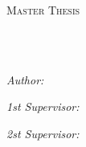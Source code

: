 \documentclass[
12pt, %
oneside, %
english, %
onehalfspacing, %
nolistspacing, %
parskip, %
headsepline, %
]{MastersDoctoralThesis} %
\author{Galina \textsc{Ryazanskaya}} %
\begin{document}
\frontmatter %

\pagestyle{plain} %


\begin{titlepage}


\begin{center}
\vspace*{.06\textheight}
{\scshape\LARGE \univname\par}\vspace{1.5cm} %
\textsc{\Large Master Thesis}\\[0.5cm] %

\HRule \\[0.4cm] %
{\huge \bfseries \ttitle\par}\vspace{0.4cm} %
\HRule \\[1.5cm] %
 
\begin{minipage}[t]{0.4\textwidth}
	\begin{flushleft} \large
	\emph{Author:}\\
	{\authorname} %
	\end{flushleft}
\end{minipage}
\begin{minipage}[t]{0.4\textwidth}
	\begin{flushright} \large
		\emph{1st Supervisor:} \\
		{\supname} %
	\end{flushright}
	\begin{flushright} \large
		\emph{2st Supervisor:} \\
		{\examname} %
	\end{flushright}
\end{minipage}\\[2cm]
 

\end{center}
\end{titlepage}
\end{document}
